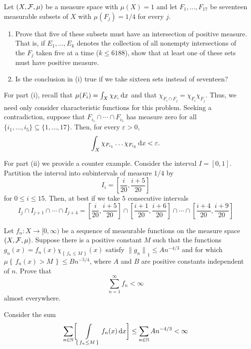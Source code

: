 \begin{problem}
  Let $(X,\mathcal{F},\mu)$ be a measure space with $\mu(X)=1$ and let
  $F_1,\ldots,F_{17}$ be seventeen measurable subsets of $X$ with
  $\mu(F_j)=1/4$ for every $j$.
  \begin{enumerate}[label=(\roman*),noitemsep]
  \item Prove that five of these subsets must have an intersection of
    positive measure. That is, if $E_1,\ldots,E_k$ denotes the collection
    of all nonempty intersections of the $F_j$ taken five at a time ($k\leq
    6188$), show that at least one of these sets must have positive
    measure.
  \item Is the conclusion in (i) true if we take sixteen sets instead of
    seventeen?
  \end{enumerate}
\end{problem}
\begin{solution}
  For part (i), recall that $\mu(F_i)=\int_X\chi_{F_i}\mathop{}\!\mathrm{d} x$ and that
  $\chi_{F_i\cap F_j}=\chi_{F_i}\chi_{F_j}$. Thus, we need only consider
  characteristic functions for this problem. Seeking a contradiction,
  suppose that $F_{i_1}\cap\cdots\cap F_{i_5}$ has measure zero for all
  $\{i_1,\ldots,i_5\}\subseteq\{1,\ldots,17\}$. Then, for every
  $\varepsilon>0$,
  \[
    \int_X\chi_{F_{i_1}}\ldots\chi_{F_{i_5}}\mathop{}\!\mathrm{d} x<\varepsilon.
  \]

  For part (ii) we provide a counter example. Consider the interval
  $I=[0,1]$. Partition the interval into subintervals of measure $1/4$ by
  \[
    I_i=\left[\frac{i}{20},\frac{i+5}{20}\right]
  \]
  for $0\leq i\leq 15$. Then, at best if we take $5$ consecutive intervals
  \[
    I_{j}\cap I_{j+1}\cap\cdots\cap I_{j+4}
    =\left[\frac{i}{20},\frac{i+5}{20}\right]\cap
    \left[\frac{i+1}{20},\frac{i+6}{20}\right]\cap\cdots\cap
    \left[\frac{i+4}{20},\frac{i+9}{20}\right]
  \]
\end{solution}

\begin{problem}
  Let $f_n\colon X\to[0,\infty)$ be a sequence of measurable functions on
  the measure space $(X,\mathcal{F},\mu)$. Suppose there is a positive constant
  $M$ such that the functions
  $g_n(x)=f_n (x)\chi_{\left\{\,f_n\leq M\,\right\}}(x)$ satisfy
  ${\|g_n\|}_1\leq An^{-4/3}$ and for which
  $\mu\left\{\,f_n(x)>M\,\right\}\leq Bn^{-5/4}$, where $A$ and $B$ are
  positive constants independent of $n$. Prove that
  \[
    \sum_{n=1}^\infty f_n<\infty
  \]
  almost everywhere.
\end{problem}
\begin{solution}
  Consider the sum
  \[
    \sum_{n\in\mathbb{N}}\biggl[\int\limits_{\left\{\,f_n\leq
        M\,\right\}}f_n(x)\mathop{}\!\mathrm{d} x\biggr]\leq\sum_{n\in\mathbb{N}}An^{-4/3}<\infty
  \]
\end{solution}

